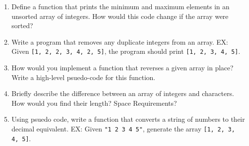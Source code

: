 \documentclass[11pt]{article}
\begin{document}
\begin{enumerate}[leftmargin=*]
\vspace{4in}

\item Define a function that prints the minimum and maximum elements in an unsorted array of integers. How would this code change if the array were sorted?

\vspace{4in}

\item Write a program that removes any duplicate integers from an array. EX: Given \verb|[1, 2, 2, 3, 4, 2, 5]|, the program should print \verb|[1, 2, 3, 4, 5]|.

\vspace{4in}

\item How would you implement a function that reverses a given array in place? Write a high-level psuedo-code for this function.

\vspace{4in}

%
\item Briefly describe the difference between an array of integers and characters. How would you find their length? Space Requirements?

\vspace{4in}

%
\item Using psuedo code, write a function that converts a string of numbers to their decimal equivalent. EX: Given \verb|"1 2 3 4 5"|, generate the array \verb|[1, 2, 3, 4, 5]|.

\vspace{4in}

\end{enumerate}

\label{r:lastpage}
\end{document}
